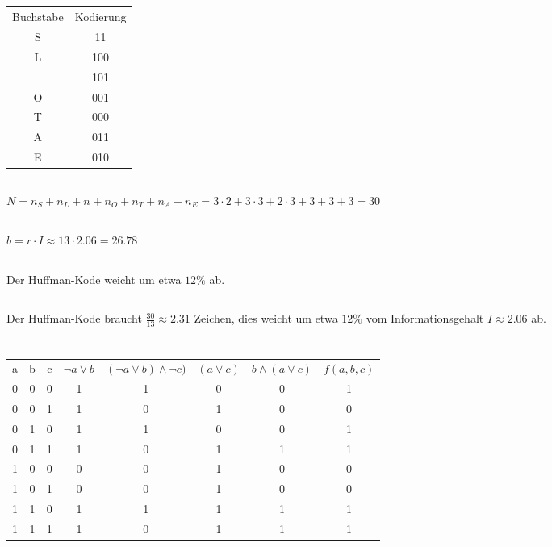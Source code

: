 \documentclass{article}
\begin{document}
\subsection{}
\begin{tabular}{c|c}
    Buchstabe&Kodierung\\
    S&11\\
    L&100\\
    &101\\
    O&001\\
    T&000\\
    A&011\\
    E&010\\
\end{tabular}
\subsection{}
$N = n_S+n_L+n_{}+n_O+n_T+n_A+n_E = 3\cdot 2+ 3\cdot 3+2\cdot 3+3+3+3 = 30$
\subsection{}
$b = r\cdot I \approx 13 \cdot 2.06 = 26.78$
\subsection{}
Der Huffman-Kode weicht um etwa $12\%$ ab.
\subsection{}
Der Huffman-Kode braucht $\frac{30}{13}\approx 2.31$ Zeichen,
dies weicht um etwa $12\%$ vom
Informationsgehalt $I\approx 2.06$ ab.
\section{}
\subsection{}
\begin{tabular}{c|c|c|c|c|c|c|c}
    a&b&c&$\neg a \lor b$&$(\neg a \lor b) \land \neg c)$&$(a\lor c)$&$b \land (a \lor c)$&$f(a,b,c)$\\
    0&0&0&1&1&0&0&1\\
    0&0&1&1&0&1&0&0\\
    0&1&0&1&1&0&0&1\\
    0&1&1&1&0&1&1&1\\
    1&0&0&0&0&1&0&0\\
    1&0&1&0&0&1&0&0\\
    1&1&0&1&1&1&1&1\\
    1&1&1&1&0&1&1&1\\
\end{tabular}
\end{document}
